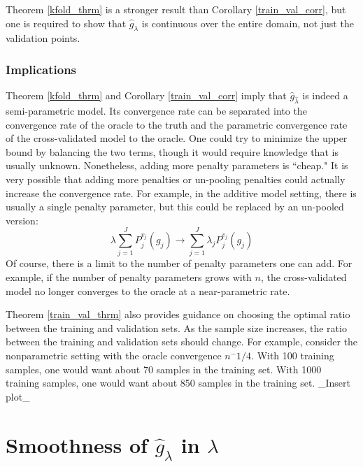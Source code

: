 \documentclass[12pt]{article}
\begin{document}
Theorem \ref{kfold_thrm} is a stronger result than Corollary \ref{train_val_corr}, but one is required to show that $\hat{g}_\lambda$ is continuous over the entire domain, not just the validation points.

\subsubsection{Implications}

Theorem \ref{kfold_thrm} and Corollary \ref{train_val_corr} imply that $\hat{g}_{\hat{\lambda}}$ is indeed a semi-parametric model. Its convergence rate can be separated into the convergence rate of the oracle to the truth and the parametric convergence rate of the cross-validated model to the oracle. One could try to minimize the upper bound by balancing the two terms, though it would require knowledge that is usually unknown. Nonetheless, adding more penalty parameters is ``cheap." It is very possible that adding more penalties or un-pooling penalties could actually increase the convergence rate. For example, in the additive model setting, there is usually a single penalty parameter, but this could be replaced by an un-pooled version:
\begin{equation}
\lambda \sum_{j=1}^J P_j^{v_j}(g_j) \rightarrow  \sum_{j=1}^J \lambda_j P_j^{v_j}(g_j)
\end{equation}
Of course, there is a limit to the number of penalty parameters one can add. For example, if the number of penalty parameters grows with $n$, the cross-validated model no longer converges to the oracle at a near-parametric rate.

Theorem \ref{train_val_thrm} also provides guidance on choosing the optimal ratio between the training and validation sets. As the sample size increases, the ratio between the training and validation sets should change. For example, consider the nonparametric setting with the oracle convergence $n^-1/4$. With 100 training samples, one would want about 70 samples in the training set. With 1000 training samples, one would want about 850 samples in the training set. \_Insert plot\_

\section{Smoothness of $\hat{g}_\lambda$ in $\lambda$}\label{sec:entropy}
\end{document}
